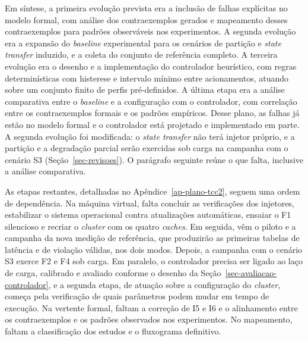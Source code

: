 Em síntese, a primeira evolução prevista era a inclusão de falhas explícitas no modelo formal, com análise dos contraexemplos gerados e mapeamento desses contraexemplos para padrões observáveis nos experimentos. A segunda evolução era a expansão do \emph{baseline} experimental para os cenários de partição e \emph{state transfer} induzido, e a coleta do conjunto de referência completo. A terceira evolução era o desenho e a implementação do controlador heurístico, com regras determinísticas com histerese e intervalo mínimo entre acionamentos, atuando sobre um conjunto finito de perfis pré-definidos. A última etapa era a análise comparativa entre o \emph{baseline} e a configuração com o controlador, com correlação entre os contraexemplos formais e os padrões empíricos. Desse plano, as falhas já estão no modelo formal e o controlador está projetado e implementado em parte. A segunda evolução foi modificada: o \emph{state transfer} não terá injetor próprio, e a partição e a degradação parcial serão exercidas sob carga na campanha com o cenário S3 (Seção~\ref{sec-revisoes}). O parágrafo seguinte reúne o que falta, inclusive a análise comparativa.

As etapas restantes, detalhadas no Apêndice~\ref{ap-plano-tcc2}, seguem uma ordem de dependência. Na máquina virtual, falta concluir as verificações dos injetores, estabilizar o sistema operacional contra atualizações automáticas, ensaiar o F1 silencioso e recriar o \emph{cluster} com os quatro \emph{caches}. Em seguida, vêm o piloto e a campanha da nova medição de referência, que produzirão as primeiras tabelas de latência e de violação válidas, nos dois modos. Depois, a campanha com o cenário S3 exerce F2 e F4 sob carga. Em paralelo, o controlador precisa ser ligado ao laço de carga, calibrado e avaliado conforme o desenho da Seção~\ref{sec-avaliacao-controlador}, e a segunda etapa, de atuação sobre a configuração do \emph{cluster}, começa pela verificação de quais parâmetros podem mudar em tempo de execução. Na vertente formal, faltam a correção de I5 e I6 e o alinhamento entre os contraexemplos e os padrões observados nos experimentos. No mapeamento, faltam a classificação dos estudos e o fluxograma definitivo.
